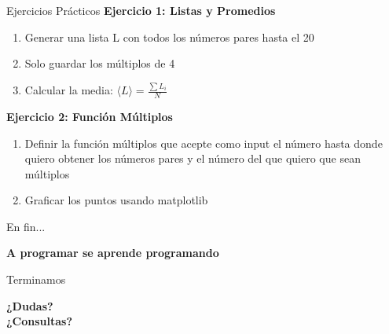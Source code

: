 \documentclass{beamer}
\begin{document}
\begin{frame}{Ejercicios Prácticos}
\textbf{Ejercicio 1: Listas y Promedios}
\begin{enumerate}
    \item Generar una lista L con todos los números pares hasta el 20
    \item Solo guardar los múltiplos de 4
    \item Calcular la media: $\langle L \rangle = \frac{\sum L_i}{N}$
\end{enumerate}

\textbf{Ejercicio 2: Función Múltiplos}
\begin{enumerate}
    \item Definir la función múltiplos que acepte como input el número hasta donde quiero obtener los números pares y el número del que quiero que sean múltiplos
    \item Graficar los puntos usando matplotlib
\end{enumerate}
\end{frame}

\begin{frame}{En fin...}
\begin{center}
\Huge\textbf{A programar se aprende programando}
\end{center}
\end{frame}

\begin{frame}{Terminamos}
    \begin{center}
        \Large{\textbf{¿Dudas?\\¿Consultas?}}
    \end{center}
\end{frame}
\end{document}
